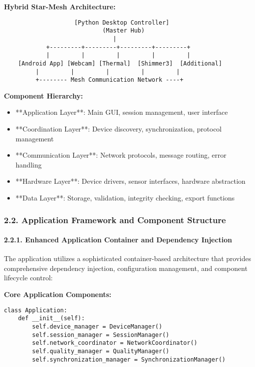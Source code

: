 \documentclass[11pt,a4paper]{article}
\begin{document}
\textbf{Hybrid Star-Mesh Architecture:}

\begin{verbatim}
                    [Python Desktop Controller]
                            (Master Hub)
                               |
            +---------+---------+---------+---------+
            |         |         |         |         |
    [Android App] [Webcam] [Thermal]  [Shimmer3]  [Additional]
         |         |         |         |         |
         +-------- Mesh Communication Network ----+
\end{verbatim}

\textbf{Component Hierarchy:}

\begin{itemize}
\item **Application Layer**: Main GUI, session management, user interface
\item **Coordination Layer**: Device discovery, synchronization, protocol management
\item **Communication Layer**: Network protocols, message routing, error handling
\item **Hardware Layer**: Device drivers, sensor interfaces, hardware abstraction
\item **Data Layer**: Storage, validation, integrity checking, export functions

\end{itemize}
\subsubsection{2.2. Application Framework and Component Structure}

\paragraph{2.2.1. Enhanced Application Container and Dependency Injection}

The application utilizes a sophisticated container-based architecture that provides comprehensive dependency injection,
configuration management, and component lifecycle control:

\textbf{Core Application Components:}

\begin{verbatim}
class Application:
    def __init__(self):
        self.device_manager = DeviceManager()
        self.session_manager = SessionManager()
        self.network_coordinator = NetworkCoordinator()
        self.quality_manager = QualityManager()
        self.synchronization_manager = SynchronizationManager()
\end{verbatim}
\end{document}
